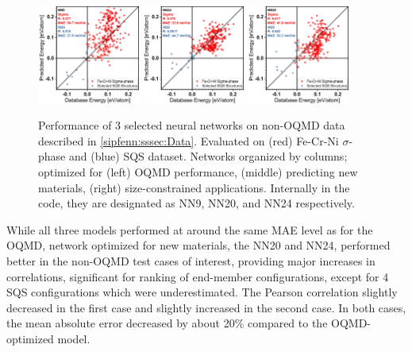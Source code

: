 \begin{figure}[H]
\centering
    \includegraphics[width=0.3\textwidth]{sipfenn/NN9_sigmasqs.png}
    \hspace{0.03\textwidth}
    \includegraphics[width=0.3\textwidth]{sipfenn/NN24_sigmasqs.png}
    \hspace{0.03\textwidth}
    \includegraphics[width=0.3\textwidth]{sipfenn/NN20_sigmasqs.png}
    \caption{Performance of 3 selected neural networks on non-OQMD data described in \ref{sipfenn:sssec:Data}. Evaluated on (red) Fe-Cr-Ni $\sigma$-phase and (blue) SQS dataset. Networks organized by columns; optimized for (left) OQMD performance, (middle) predicting new materials, (right) size-constrained applications. Internally in the code, they are designated as NN9, NN20, and NN24 respectively.}
    \label{sipfenn:fig:sigmasqsperformance}
\end{figure}

While all three models performed at around the same MAE level as for the OQMD, network optimized for new materials, the NN20 and NN24, performed better in the non-OQMD test cases of interest, providing major increases in correlations, significant for ranking of end-member configurations, except for 4 SQS configurations which were underestimated. The Pearson correlation slightly decreased in the first case and slightly increased in the second case. In both cases, the mean absolute error decreased by about 20\% compared to the OQMD-optimized model.


